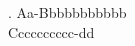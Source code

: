 
\makeatletter
\def\lx@glossfont{\textdir TRT}
\let\lxtest@wordbegin\lx@gl@wordbegin
\def\lx@gl@wordbegin#1{\textdir TLT\lxtest@wordbegin{#1}}
\makeatother

\GlossMorphAlign

\ex. \gll Aa-Bbbbbbbbbbb \\
          Cccccccccc-dd \\


